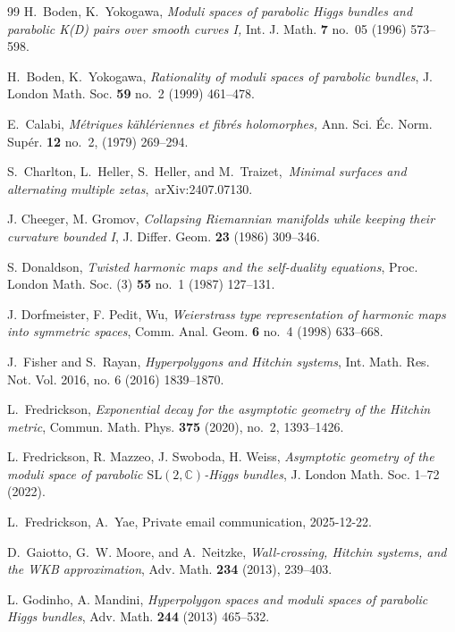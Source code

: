 \documentclass[12pt,a4paper]{amsart}
\theoremstyle{definition}
\theoremstyle{remark}
\newcommand{\C}{\mathbb C}
\begin{document}
\begin{thebibliography}{99}
 H.~Boden, K.~Yokogawa, {\em Moduli spaces of parabolic Higgs bundles and parabolic K(D) pairs
over smooth curves I,} Int. J. Math. \textbf{7} no.~05 (1996) 573--598.

 H.~Boden, K.~Yokogawa, {\em Rationality of moduli spaces of parabolic bundles}, J. London Math.
Soc. \textbf{59} no.~2 (1999) 461--478.

E.~Calabi, {\em M\'etriques k\"ahl\'eriennes et fibr\'es holomorphes,} Ann. Sci. \'Ec. Norm. Sup\'er. \textbf{12} no.~2,
(1979) 269--294.

S.~Charlton, L.~Heller, S.~Heller, and M.~Traizet,\
\emph{Minimal surfaces and alternating multiple zetas},\
arXiv:2407.07130.

J. Cheeger, M. Gromov, {\em 
Collapsing Riemannian manifolds while keeping their curvature bounded I}, J. Differ.
Geom. \textbf{23} (1986) 309--346.

 S. Donaldson, {\em Twisted harmonic maps and the self-duality equations}, Proc. London Math. Soc. (3) \textbf{55} no.~1 (1987) 127--131.


\bibitem{DPW} J. Dorfmeister, F. Pedit, Wu,
\emph{Weierstrass type representation of
  harmonic maps into symmetric spaces}, Comm. Anal. Geom. \textbf{6} no.~4 (1998) 633--668.

\bibitem{FR16} J.~Fisher and S.~Rayan, {\em Hyperpolygons and Hitchin systems}, Int. Math. Res. Not. Vol. 2016,
no. 6 (2016) 1839--1870.


L.~Fredrickson,
\emph{Exponential decay for the asymptotic geometry of the Hitchin metric},
Commun. Math. Phys. \textbf{375} (2020), no.~2, 1393--1426.

L. Fredrickson, R. Mazzeo, J. Swoboda, H. Weiss, {\em  Asymptotic geometry of the moduli space of
parabolic $\mathrm{SL}(2,\C)$-Higgs bundles}, J. London Math. Soc. 1--72 (2022).

\bibitem{FredYae26} 
L.~Fredrickson, A.~Yae, Private email communication, 2025-12-22.


D.~Gaiotto, G.~W. Moore, and A.~Neitzke,
 {\em Wall-crossing, Hitchin systems, and the WKB approximation},
Adv. Math. \textbf{234} (2013), 239--403.

 L. Godinho, A. Mandini, {\em Hyperpolygon spaces and moduli spaces of parabolic Higgs bundles}, Adv. Math. \textbf{244} (2013) 465--532.



\end{thebibliography}
\end{document}
